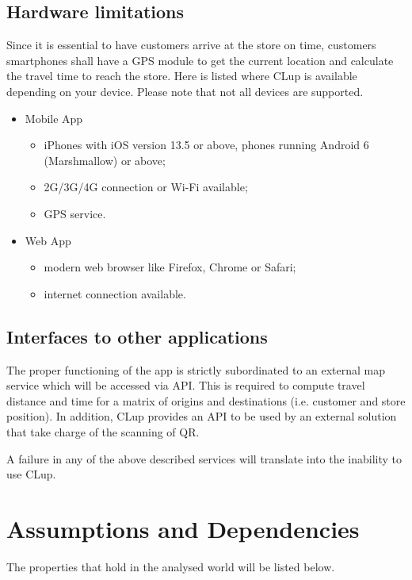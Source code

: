 \subsection{Hardware limitations}
Since it is essential to have customers arrive at the store on time, customers smartphones shall have a GPS module to get the current location and calculate the travel time to reach the store.\newline
Here is listed where CLup is available depending on your device. Please note that not all devices are supported.
\begin{itemize}
	\item Mobile App
		\begin{itemize}
			\item iPhones with iOS version 13.5 or above, phones running Android 6 (Marshmallow) or above;
			\item 2G/3G/4G connection or Wi-Fi available;
			\item GPS service.
		\end{itemize}
	\item Web App
		\begin{itemize}
			\item modern web browser like Firefox, Chrome or Safari;
			\item internet connection available.
		\end{itemize}
\end{itemize}

\subsection{Interfaces to other applications}
The proper functioning of the app is strictly subordinated to an external map service which will be accessed via API. This is required to compute travel distance and time for a matrix of origins and destinations (i.e. customer and store position).\newline
In addition, CLup provides an API to be used by an external solution that take charge of the scanning of QR.

A failure in any of the above described services will translate into the inability to use CLup.

\clearpage

\section{Assumptions and Dependencies}
The properties that hold in the analysed world will be listed below.
